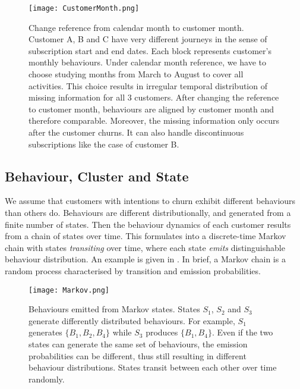\documentclass[english,a4,oneside,9pt]{extarticle}
\begin{document}
\begin{figure}[htb]
\centering
\texttt{[image: CustomerMonth.png]}
\caption{Change reference from calendar month to customer month. Customer A, B and C have very different journeys in the sense of subscription start and end dates. Each block represents customer's monthly behaviours. Under calendar month reference, we have to choose studying months from March to August to cover all activities. This choice results in irregular temporal distribution of missing information for all 3 customers. After changing the reference to customer month, behaviours are aligned by customer month and therefore comparable. Moreover, the missing information only occurs after the customer churns. It can also handle discontinuous subscriptions like the case of customer B.}
\label{fig:customerMonth}
\end{figure} 


\vspace*{-3mm}

\subsection*{Behaviour, Cluster and State}

We assume that customers with intentions to churn exhibit different behaviours than others do. Behaviours are different distributionally, and generated from a finite number of states. Then the behaviour dynamics of each customer results from a chain of states over time. This formulates into a discrete-time Markov chain with states \textit{transiting} over time, where each state \textit{emits} distinguishable behaviour distribution. An example is given in . In brief, a Markov chain is a random process characterised by transition and emission probabilities.

\begin{figure}[htb]
\centering
\texttt{[image: Markov.png]}
\caption{Behaviours emitted from Markov states. States $S_1$, $S_2$ and $S_3$ generate differently distributed behaviours. For example, $S_1$ generates $\{B_1, B_2, B_4\}$ while $S_3$ produces $\{ B_1, B_4\}$.
Even if the two states can generate the same set of behaviours, the emission probabilities can be different, thus still resulting in different behaviour distributions. States transit between each other over time randomly.}
\label{fig:markov}
\end{figure}
\end{document}
